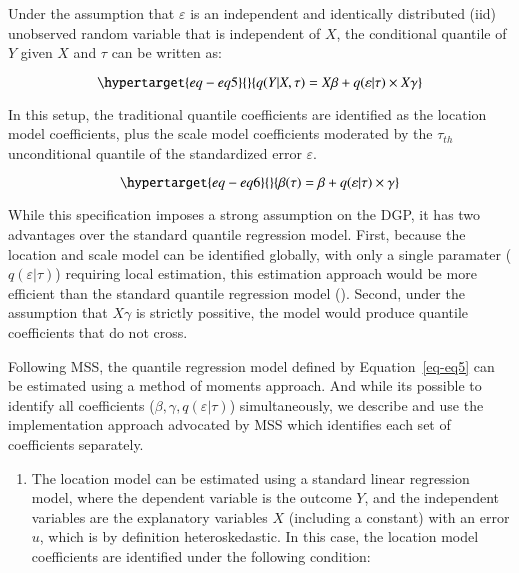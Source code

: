 \documentclass[
  authoryear,
  preprint,
  1p]{elsarticle}
\providecommand{\tightlist}{%
  \setlength{\itemsep}{0pt}\setlength{\parskip}{0pt}}\usepackage{longtable,booktabs,array}
\begin{document}
Under the assumption that \(\varepsilon\) is an independent and
identically distributed (iid) unobserved random variable that is
independent of \(X\), the conditional quantile of \(Y\) given \(X\) and
\(\tau\) can be written as:

\begin{equation}\protect\hypertarget{eq-eq5}{}{q(Y|X,\tau) =X\beta+q(\varepsilon|\tau) \times X\gamma 
}\label{eq-eq5}\end{equation}

In this setup, the traditional quantile coefficients are identified as
the location model coefficients, plus the scale model coefficients
moderated by the \(\tau_{th}\) unconditional quantile of the
standardized error \(\varepsilon\).

\begin{equation}\protect\hypertarget{eq-eq6}{}{\beta(\tau) = \beta + q(\varepsilon|\tau) \times \gamma 
}\label{eq-eq6}\end{equation}

While this specification imposes a strong assumption on the DGP, it has
two advantages over the standard quantile regression model. First,
because the location and scale model can be identified globally, with
only a single paramater (\(q(\varepsilon|\tau)\)) requiring local
estimation, this estimation approach would be more efficient than the
standard quantile regression model (\citet{zhao2000}). Second, under the
assumption that \(X\gamma\) is strictly possitive, the model would
produce quantile coefficients that do not cross.

Following MSS, the quantile regression model defined by
Equation~\ref{eq-eq5} can be estimated using a method of moments
approach. And while its possible to identify all coefficients
(\(\beta,\gamma, q(\varepsilon|\tau)\)) simultaneously, we describe and
use the implementation approach advocated by MSS which identifies each
set of coefficients separately.

\begin{enumerate}
\def\labelenumi{\arabic{enumi}.}
\tightlist
\item
  The location model can be estimated using a standard linear regression
  model, where the dependent variable is the outcome \(Y\), and the
  independent variables are the explanatory variables \(X\) (including a
  constant) with an error \(u\), which is by definition heteroskedastic.
  In this case, the location model coefficients are identified under the
  following condition:
\end{enumerate}
\end{document}
